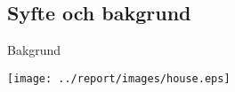 \subsection{Syfte och bakgrund}

\begin{frame}{Bakgrund}

  \begin{center}
    \texttt{[image: ../report/images/house.eps]}
  \end{center}

\end{frame}